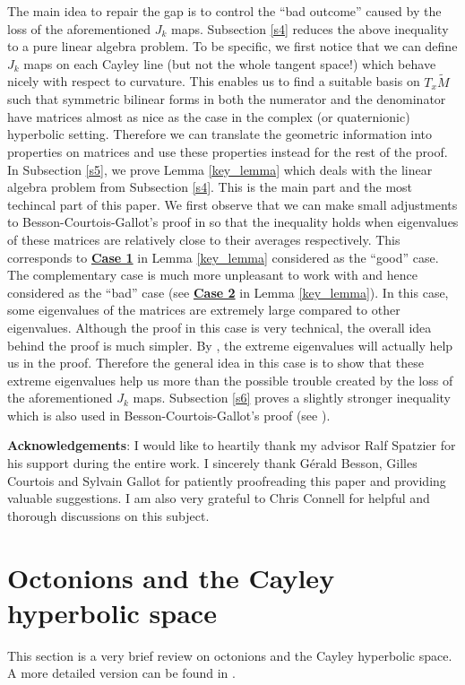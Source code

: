 \documentclass{article}
\theoremstyle{definition}
\begin{document}
The main idea to repair the gap is to control the ``bad outcome'' caused by the loss of the aforementioned $J_k$ maps. Subsection \ref{s4} reduces the above inequality to a pure linear algebra problem. To be specific, we first notice that we can define $J_k$ maps on each Cayley line (but not the whole tangent space!) which behave nicely with respect to curvature. This enables us to find a suitable basis on $T_x\widetilde M$ such that symmetric bilinear forms in both the numerator and the denominator have matrices almost as nice as the case in the complex (or quaternionic) hyperbolic setting. Therefore we can translate the geometric information into properties on matrices and use these properties instead for the rest of the proof. In Subsection \ref{s5}, we prove Lemma \ref{key_lemma} which deals with the linear algebra problem from Subsection \ref{s4}. This is the main part and the most techincal part of this paper. We first observe that we can make small adjustments to Besson-Courtois-Gallot's proof in \cite[Appendice B]{BCG1} so that the inequality holds when eigenvalues of these matrices are relatively close to their averages respectively. This corresponds to \hyperlink{case1}{\textbf{Case 1}} in Lemma \ref{key_lemma} considered as the ``good'' case. The complementary case is much more unpleasant to work with and hence considered as the ``bad'' case (see \hyperlink{case2}{\textbf{Case 2}} in Lemma \ref{key_lemma}). In this case, some eigenvalues of the matrices are extremely large compared to other eigenvalues. Although the proof in this case is very technical, the overall idea behind the proof is much simpler. By \cite[B.4 Lemme]{BCG1}, the extreme eigenvalues will actually help us in the proof. Therefore the general idea in this case is to show that these extreme eigenvalues help us more than the possible trouble created by the loss of the aforementioned $J_k$ maps. Subsection \ref{s6} proves a slightly stronger inequality which is also used in Besson-Courtois-Gallot's proof (see \cite[B.5 Proposition]{BCG1}).

\textbf{Acknowledgements}: I would like to heartily thank my advisor Ralf Spatzier for his support during the entire work. I sincerely thank G\'erald Besson, Gilles Courtois and Sylvain Gallot for patiently proofreading this paper and providing valuable suggestions. I am also very grateful to Chris Connell for helpful and thorough discussions on this subject. 





\section{Octonions and the Cayley hyperbolic space}\label{s1}
This section is a very brief review on octonions and the Cayley hyperbolic space. A more detailed version can be found in \cite[Appendix A]{Ruan1}.
\end{document}
